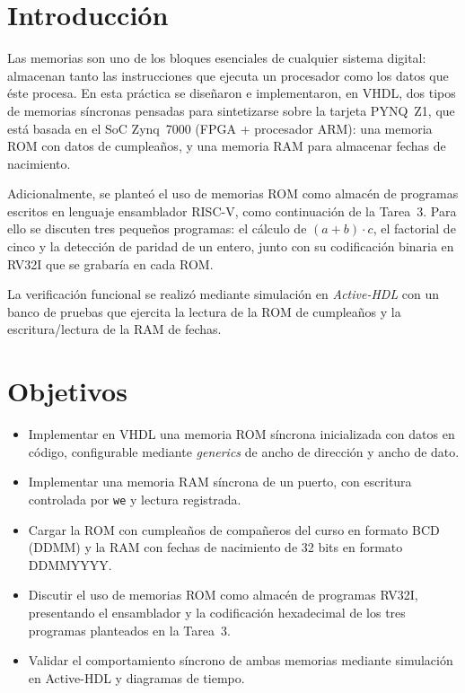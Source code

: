 \documentclass[12pt,letterpaper]{article}
\begin{document}
\section{Introducción}
Las memorias son uno de los bloques esenciales de cualquier sistema digital: almacenan tanto las instrucciones que ejecuta un procesador como los datos que éste procesa. En esta práctica se diseñaron e implementaron, en VHDL, dos tipos de memorias síncronas pensadas para sintetizarse sobre la tarjeta PYNQ~Z1, que está basada en el SoC Zynq~7000 (FPGA + procesador ARM): una memoria ROM con datos de cumpleaños, y una memoria RAM para almacenar fechas de nacimiento.

Adicionalmente, se planteó el uso de memorias ROM como almacén de programas escritos en lenguaje ensamblador RISC-V, como continuación de la Tarea~3. Para ello se discuten tres pequeños programas: el cálculo de $(a+b)\cdot c$, el factorial de cinco y la detección de paridad de un entero, junto con su codificación binaria en RV32I que se grabaría en cada ROM.

La verificación funcional se realizó mediante simulación en \textit{Active-HDL} con un banco de pruebas que ejercita la lectura de la ROM de cumpleaños y la escritura/lectura de la RAM de fechas.

\section{Objetivos}
\begin{itemize}
  \item Implementar en VHDL una memoria ROM síncrona inicializada con datos en código, configurable mediante \textit{generics} de ancho de dirección y ancho de dato.
  \item Implementar una memoria RAM síncrona de un puerto, con escritura controlada por \texttt{we} y lectura registrada.
  \item Cargar la ROM con cumpleaños de compañeros del curso en formato BCD (DDMM) y la RAM con fechas de nacimiento de 32 bits en formato DDMMYYYY.
  \item Discutir el uso de memorias ROM como almacén de programas RV32I, presentando el ensamblador y la codificación hexadecimal de los tres programas planteados en la Tarea~3.
  \item Validar el comportamiento síncrono de ambas memorias mediante simulación en Active-HDL y diagramas de tiempo.
\end{itemize}
\end{document}
